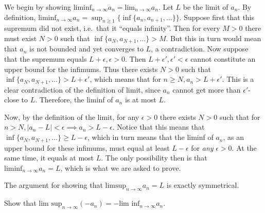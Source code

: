 \begin{solution}

    We begin by showing $\text{liminf}_{n\rightarrow \infty} a_n = \text{lim}_{n \rightarrow \infty} a_n$. Let $L$ be the limit of $a_n$. By definition, $\text{liminf}_{n\rightarrow \infty} a_n = \sup_{n \geq 1} \{\inf\{a_n, a_{n+1}, \ldots\}\}$. Suppose first that this supremum did not exist, i.e.\ that it ``equals infinity''. Then for every $M > 0$ there must exist $N > 0$ such that $\inf\{a_N, a_{N+1}, \ldots\} > M$. But this in turn would mean that $a_n$ is not bounded and yet converges to $L$, a contradiction. Now suppose that the supremum equals $L + \epsilon, \epsilon > 0$. Then $L + \epsilon', \epsilon' < \epsilon$ cannot constitute an upper bound for the infimums. Thus there exists $N > 0$ such that $\inf\{a_N, a_{N+1}, \ldots\} > L + \epsilon'$, which means that for $n \geq N, a_n > L + \epsilon'$. This is a clear contradiction of the definition of limit, since $a_n$ cannot get more than $\epsilon'$-close to $L$. Therefore, the liminf of $a_n$ is at most $L$.

    Now, by the definition of the limit, for any $\epsilon > 0$ there exists $N > 0$ such that for $n > N, \lvert a_n - L \rvert < \epsilon \implies a_n > L - \epsilon$. Notice that this means that $\inf\{a_{N}, a_{N+1}, \ldots\} \geq L - \epsilon$, which in turn means that the liminf of $a_n$, as an upper bound for these infimums, must equal at least $L - \epsilon$ for \textit{any} $\epsilon > 0$. At the same time, it equals at most $L$. The only possibility then is that $\text{liminf}_{n\rightarrow \infty} a_n = L$, which is what we are asked to prove.

    The argument for showing that $\text{limsup}_{n\rightarrow \infty} a_n = L$ is exactly symmetrical.
\end{solution}

\begin{exercise}{24}
    Show that $\text{lim sup}_{n \rightarrow \infty} (-a_n) = -\text{lim inf}_{n \rightarrow \infty} a_n$.
\end{exercise}

